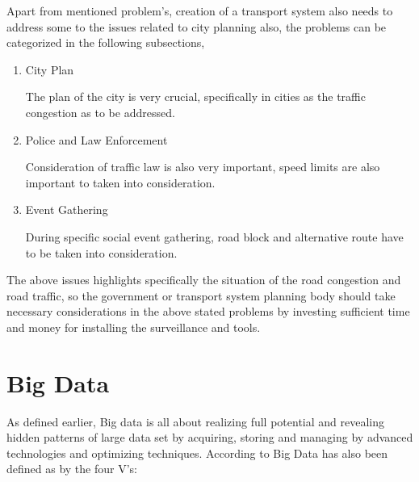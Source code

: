 \documentclass[sigconf]{acmart}
\begin{document}
Apart from mentioned problem's, creation of a transport system also needs to address some to the issues related to city planning also, the problems can be categorized in the following subsections,

\begin{enumerate}
\item City Plan 

The plan of the city is very crucial, specifically in cities as the traffic congestion as to be addressed. 

\item Police and Law Enforcement 

Consideration of traffic law is also very important, speed limits are also important to taken into consideration.

\item Event Gathering 

During specific social event gathering, road block and alternative route have to be taken into consideration.

\end{enumerate}

The above issues highlights specifically the situation of the road congestion and road traffic, so the government or transport system planning body should take necessary considerations in the above stated problems by investing sufficient time and money for installing the surveillance and tools. 


\section{Big Data}

As defined earlier, Big data is all about realizing full potential and revealing hidden patterns of large data set by acquiring, storing and managing by advanced technologies and optimizing techniques. According to \cite{} Big Data has also been defined as by the four V's:
\end{document}
